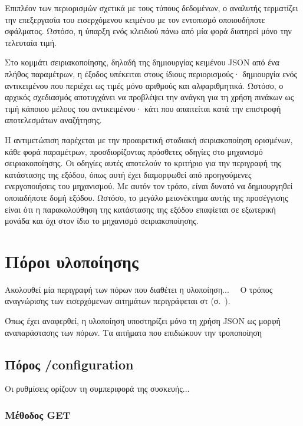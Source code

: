 Επιπλέον των περιορισμών σχετικά με τους τύπους δεδομένων, ο αναλυτής τερματίζει
την επεξεργασία του εισερχόμενου κειμένου με τον εντοπισμό οποιουδήποτε
σφάλματος. Ωστόσο, η ύπαρξη ενός κλειδιού πάνω από μία φορά διατηρεί μόνο την
τελευταία τιμή.

Στο κομμάτι σειριακοποίησης, δηλαδή της δημιουργίας κειμένου JSON από ένα πλήθος
παραμέτρων, η έξοδος υπέκειται στους ίδιους περιορισμούς· δημιουργία ενός
αντικειμένου που περιέχει ως τιμές μόνο αριθμούς και αλφαριθμητικά. Ωστόσο, ο
αρχικός σχεδιασμός αποτυγχάνει να προβλέψει την ανάγκη για τη χρήση πινάκων ως
τιμή κάποιου μέλους του αντικειμένου· κάτι που απαιτείται κατά την επιστροφή
αποτελεσμάτων αναζήτησης.

Η αντιμετώπιση παρέχεται με την προαιρετική σταδιακή σειριακοποίηση ορισμένων,
κάθε φορά παραμέτρων, προσδιορίζοντας πρόσθετες οδηγίες στο μηχανισμό
σειριακοποίησης. Οι οδηγίες αυτές αποτελούν το κριτήριο για την περιγραφή της
κατάστασης της εξόδου, όπως αυτή έχει διαμορφωθεί από προηγούμενες
ενεργοποιήσεις του μηχανισμού. Με αυτόν τον τρόπο, είναι δυνατό να δημιουργηθεί
οποιαδήποτε δομή εξόδου. Ωστόσο, το μεγάλο μειονέκτημα αυτής της προσέγγισης
είναι ότι η παρακολούθηση της κατάστασης της εξόδου επαφίεται σε εξωτερική
μονάδα και όχι στον ίδιο το μηχανισμό σειριακοποίησης.


\section{Πόροι υλοποίησης}


Ακολουθεί μία περιγραφή των πόρων που διαθέτει η υλοποίηση...
~~Ο τρόπος αναγνώρισης των εισερχόμενων αιτημάτων περιγράφεται στ
 (σ.~\pageref{subsec:network:http-parser}).

Όπως έχει αναφερθεί, η υλοποίηση υποστηρίζει μόνο τη χρήση JSON ως μορφή
αναπαράστασης των πόρων. Τα αιτήματα που επιδιώκουν την τροποποίηση

\subsection{Πόρος /configuration}

Οι ρυθμίσεις ορίζουν τη συμπεριφορά της συσκευής...

\subsubsection{Μέθοδος GET}
\label{ssubsec:network:config-get}

